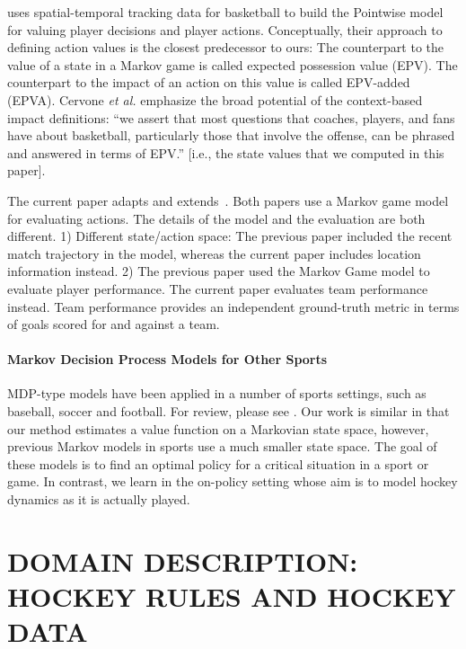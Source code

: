 \citep{Cervone2014a} uses spatial-temporal tracking data for basketball to build the {\sc Pointwise} model for valuing player decisions and player actions. Conceptually, their approach to defining action values is the closest predecessor to ours: The counterpart to the value of a state in a Markov game is called expected possession value (EPV). The counterpart to the impact of an action on this value is called EPV-added (EPVA). Cervone {\em et al.} emphasize the broad potential of the context-based impact definitions: ``we assert that most questions that coaches, players, and fans have about basketball, particularly those that involve the offense, can be phrased and answered in terms of EPV.'' [i.e., the state values that we computed in this paper].

The current paper adapts and extends~\citep{Routley2015a}. Both papers use a Markov game model for evaluating actions. The details of the model and the evaluation are both different. 1) Different state/action space: The previous paper included the recent match trajectory in the model, whereas the current paper includes location information instead. 2) The previous paper used the Markov Game model to evaluate player performance. The current paper evaluates team performance instead. Team performance provides an independent ground-truth metric in terms of goals scored for and against a team.


\paragraph{Markov Decision Process Models for Other Sports} MDP-type models have been applied in a number of sports settings, such as baseball, soccer and football. For review, please see \citep{Cervone2014a}.
Our work is similar in that our method estimates a value function on a Markovian state space, however, previous Markov models in sports use a much smaller state space.
The goal of these models is to find an optimal policy for a critical situation in a sport or game.
In contrast, we learn in the on-policy setting whose aim is to model hockey dynamics as it is actually played.




\section{DOMAIN DESCRIPTION: HOCKEY RULES AND HOCKEY DATA}
\label{sec:background-notation}

